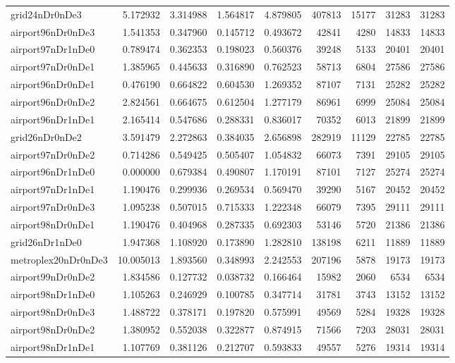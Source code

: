 \documentclass[../../../thesis.tex]{subfiles}
\begin{document}
\begin{longtable}{|l|r|r|r|r|r|r|r|r|}
grid24nDr0nDe3 & 5.172932 & 3.314988 & 1.564817 & 4.879805 & 407813 & 15177 & 31283 & 31283 \\
airport96nDr0nDe3 & 1.541353 & 0.347960 & 0.145712 & 0.493672 & 42841 & 4280 & 14833 & 14833 \\
airport97nDr1nDe0 & 0.789474 & 0.362353 & 0.198023 & 0.560376 & 39248 & 5133 & 20401 & 20401 \\
airport97nDr0nDe1 & 1.385965 & 0.445633 & 0.316890 & 0.762523 & 58713 & 6804 & 27586 & 27586 \\
airport96nDr0nDe1 & 0.476190 & 0.664822 & 0.604530 & 1.269352 & 87107 & 7131 & 25282 & 25282 \\
airport96nDr0nDe2 & 2.824561 & 0.664675 & 0.612504 & 1.277179 & 86961 & 6999 & 25084 & 25084 \\
airport96nDr1nDe1 & 2.165414 & 0.547686 & 0.288331 & 0.836017 & 70352 & 6013 & 21899 & 21899 \\
grid26nDr0nDe2 & 3.591479 & 2.272863 & 0.384035 & 2.656898 & 282919 & 11129 & 22785 & 22785 \\
airport97nDr0nDe2 & 0.714286 & 0.549425 & 0.505407 & 1.054832 & 66073 & 7391 & 29105 & 29105 \\
airport96nDr1nDe0 & 0.000000 & 0.679384 & 0.490807 & 1.170191 & 87101 & 7127 & 25274 & 25274 \\
airport97nDr1nDe1 & 1.190476 & 0.299936 & 0.269534 & 0.569470 & 39290 & 5167 & 20452 & 20452 \\
airport97nDr0nDe3 & 1.095238 & 0.507015 & 0.715333 & 1.222348 & 66079 & 7395 & 29111 & 29111 \\
airport98nDr0nDe1 & 1.190476 & 0.404968 & 0.287335 & 0.692303 & 53146 & 5720 & 21386 & 21386 \\
grid26nDr1nDe0 & 1.947368 & 1.108920 & 0.173890 & 1.282810 & 138198 & 6211 & 11889 & 11889 \\
metroplex20nDr0nDe3 & 10.005013 & 1.893560 & 0.348993 & 2.242553 & 207196 & 5878 & 19173 & 19173 \\
airport99nDr0nDe2 & 1.834586 & 0.127732 & 0.038732 & 0.166464 & 15982 & 2060 & 6534 & 6534 \\
airport98nDr1nDe0 & 1.105263 & 0.246929 & 0.100785 & 0.347714 & 31781 & 3743 & 13152 & 13152 \\
airport98nDr0nDe3 & 1.488722 & 0.378171 & 0.197820 & 0.575991 & 49569 & 5284 & 19328 & 19328 \\
airport98nDr0nDe2 & 1.380952 & 0.552038 & 0.322877 & 0.874915 & 71566 & 7203 & 28031 & 28031 \\
airport98nDr1nDe1 & 1.107769 & 0.381126 & 0.212707 & 0.593833 & 49557 & 5276 & 19314 & 19314 \\

\end{longtable}
\end{document}
